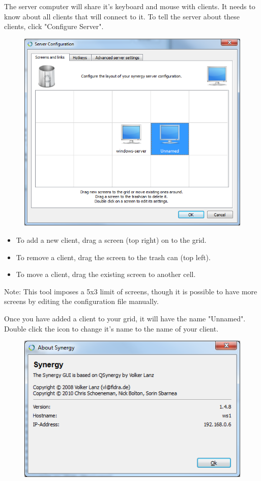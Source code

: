 The server computer will share it's keyboard and mouse with clients. It
needs to know about all clients that will connect to it. To tell the server
about these clients, click "Configure Server".

\begin{figure}[H]
\includegraphics[scale=.75]{graphics/windows-server.png}
\end{figure}

\begin{itemize}
  \item To add a new client, drag a screen (top right) on to the grid.
  \item To remove a client, drag the screen to the trash can (top left).
  \item To move a client, drag the existing screen to another cell.
\end{itemize}

Note: This tool imposes a 5x3 limit of screens, though it is possible to
have more screens by editing the configuration file manually.

Once you have added a client to your grid, it will have the name "Unnamed".
Double click the icon to change it's name to the name of your client.

\begin{figure}[H]
\includegraphics[scale=.75]{graphics/windows-about.png}
\end{figure}

